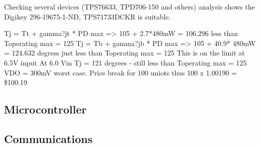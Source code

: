 \documentclass[12pt]{article}
\begin{document}
Checking several devices (TPS76633, TPD706-150 and others) analysis shows the Digikey 296-19675-1-ND, TPS71733DCKR is suitable.

Tj = Tt + gamma?jt * PD max => 105 + 2.7*480mW = 106.296 less than Toperating max = 125 
Tj = Tb + gamma?jb * PD max => 105 + 40.9* 480mW = 124.632 degress just less than Toperating max = 125 
This is on the limit at 6.5V input 
At 6.0 Vin Tj = 121 degrees - still less than Toperating max = 125 
VDO = 300mV worst case.
Price break for 100 uniots thus 100 x 1.00190 =  \$100.19 



\subsection{Microcontroller}




\subsection{Communications}


















\printbibliography
\end{document}
